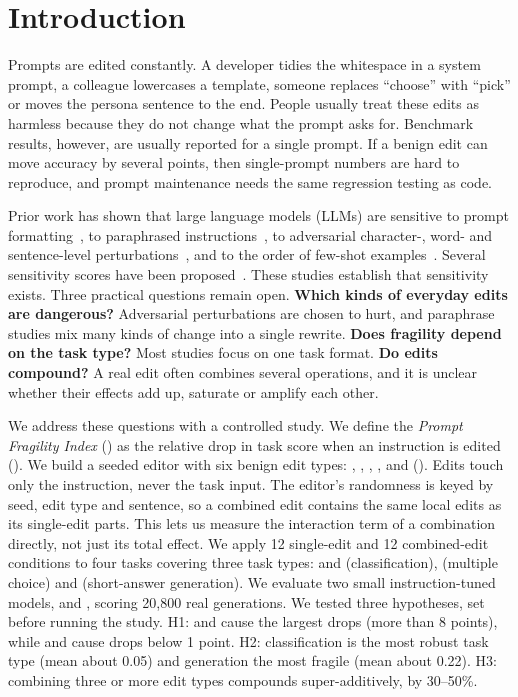 \section{Introduction}
\label{sec:intro}

Prompts are edited constantly. A developer tidies the whitespace in a system prompt, a colleague lowercases a template, someone replaces ``choose'' with ``pick'' or moves the persona sentence to the end. People usually treat these edits as harmless because they do not change what the prompt asks for. Benchmark results, however, are usually reported for a single prompt. If a benign edit can move accuracy by several points, then single-prompt numbers are hard to reproduce, and prompt maintenance needs the same regression testing as code.

Prior work has shown that large language models (LLMs) are sensitive to prompt formatting~\citep{sclar2024quantifying,voronov2024mind}, to paraphrased instructions~\citep{mizrahi2024state}, to adversarial character-, word- and sentence-level perturbations~\citep{zhu2023promptbench}, and to the order of few-shot examples~\citep{lu2022fantastically}. Several sensitivity scores have been proposed~\citep{zhuo2024prosa,chatterjee2024posix}. These studies establish that sensitivity exists. Three practical questions remain open. {\bf Which kinds of everyday edits are dangerous?} Adversarial perturbations are chosen to hurt, and paraphrase studies mix many kinds of change into a single rewrite. {\bf Does fragility depend on the task type?} Most studies focus on one task format. {\bf Do edits compound?} A real edit often combines several operations, and it is unclear whether their effects add up, saturate or amplify each other.

We address these questions with a controlled study. We define the \emph{Prompt Fragility Index} (\pfi) as the relative drop in task score when an instruction is edited (). We build a seeded editor with six benign edit types: \ws, \caps, \punct, \typo, \syn and \reord (). Edits touch only the instruction, never the task input. The editor's randomness is keyed by seed, edit type and sentence, so a combined edit contains the same local edits as its single-edit parts. This lets us measure the interaction term of a combination directly, not just its total effect. We apply 12 single-edit and 12 combined-edit conditions to four tasks covering three task types: \sst and \agnews (classification), \arc (multiple choice) and \squad (short-answer generation). We evaluate two small instruction-tuned models, \qwen and \llama, scoring 20,800 real generations. We tested three hypotheses, set before running the study. H1: \reord and \syn cause the largest drops (more than 8 points), while \ws and \caps cause drops below 1 point. H2: classification is the most robust task type (mean \pfi about 0.05) and generation the most fragile (mean \pfi about 0.22). H3: combining three or more edit types compounds super-additively, by 30--50\%.

